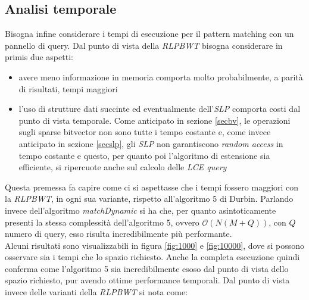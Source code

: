 \subsection{Analisi temporale}
Bisogna infine considerare i tempi di esecuzione per il pattern matching con un
pannello di query. Dal punto di vista della \textit{RLPBWT} bisogna considerare
in primis due aspetti:
\begin{itemize}
  \item avere meno informazione in memoria comporta molto probabilmente, a
  parità di risultati, tempi maggiori
  \item l'uso di strutture dati succinte ed eventualmente dell'\textit{SLP}
  comporta costi dal punto di vista temporale. Come anticipato in sezione
  \ref{secbv}, le operazioni sugli sparse bitvector non sono tutte i tempo
  costante e, come invece anticipato in sezione \ref{secslp}, gli \textit{SLP}
  non garantiscono \textit{random access} in tempo costante e questo, per quanto
  poi l'algoritmo di estensione sia efficiente, si ripercuote anche sul calcolo
  delle \textit{LCE query}
\end{itemize}
Questa premessa fa capire come ci si aspettasse che i tempi fossero maggiori con
la \textit{RLPBWT}, in ogni sua variante, rispetto all'algoritmo 5 di Durbin.
Parlando invece dell'algoritmo \textit{matchDynamic} si ha che, per quanto
asintoticamente presenti la stessa complessità dell'algoritmo 5, ovvero
$\mathcal{O}(N(M+Q))$, con $Q$ numero di query, esso risulta incredibilmente più
performante. \\
Alcuni risultati sono visualizzabili in figura \ref{fig:1000} e \ref{fig:10000},
dove si possono osservare sia i tempi che lo spazio richiesto. Anche la completa
esecuzione quindi conferma come l'algoritmo 5 sia incredibilmente esoso dal
punto di vista dello spazio richiesto, pur avendo ottime performance
temporali. Dal punto di vista invece delle varianti della \textit{RLPBWT} si
nota come:
